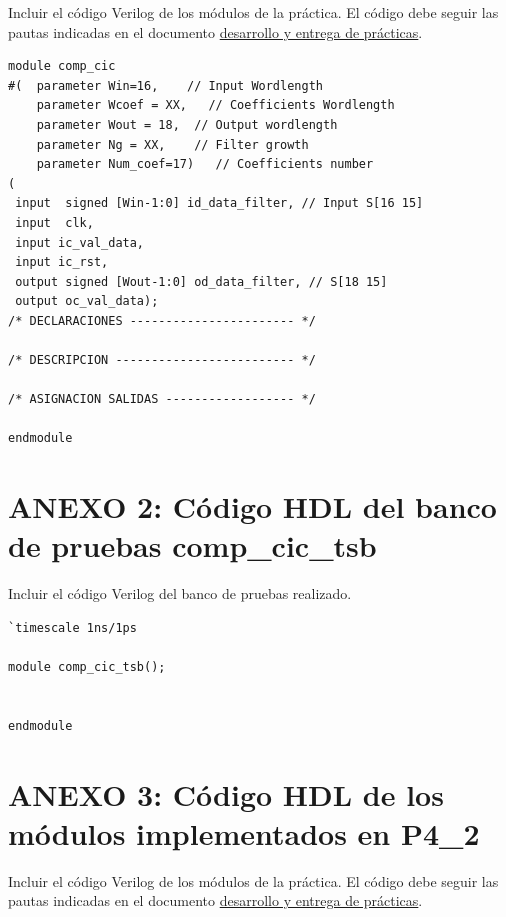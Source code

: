 \documentclass[parskip,a4paper,12pt]{article}
\begin{document}
\begin{enunciado}{}{}%
Incluir el código Verilog de los módulos de la práctica. El código debe seguir las pautas indicadas en el documento  \href{https://gised.webs.upv.es/pds_fpga/PDS_FPGA_practicas.pdf} {desarrollo y entrega de prácticas}. 
\end{enunciado}

\begin{verbatim}
module comp_cic
#(  parameter Win=16,    // Input Wordlength 
    parameter Wcoef = XX,   // Coefficients Wordlength
    parameter Wout = 18,  // Output wordlength
    parameter Ng = XX,    // Filter growth
    parameter Num_coef=17)   // Coefficients number
(
 input  signed [Win-1:0] id_data_filter, // Input S[16 15]
 input  clk, 
 input ic_val_data,
 input ic_rst,
 output signed [Wout-1:0] od_data_filter, // S[18 15]
 output oc_val_data); 
/* DECLARACIONES ----------------------- */

/* DESCRIPCION ------------------------- */	

/* ASIGNACION SALIDAS ------------------ */

endmodule 
\end{verbatim}




\section{ANEXO 2: Código HDL del banco de pruebas comp\_cic\_tsb}
\begin{enunciado}{}{}%
Incluir el código Verilog del banco de pruebas realizado.
\end{enunciado}

\begin{verbatim}
`timescale 1ns/1ps

module comp_cic_tsb();


endmodule 

\end{verbatim}
\section{ANEXO 3: Código HDL de los módulos implementados en P4\_2}

\begin{enunciado}{}{}%
Incluir el código Verilog de los módulos de la práctica. El código debe seguir las pautas indicadas en el documento  \href{https://gised.webs.upv.es/pds_fpga/PDS_FPGA_practicas.pdf} {desarrollo y entrega de prácticas}. 
\end{enunciado}
\end{document}
